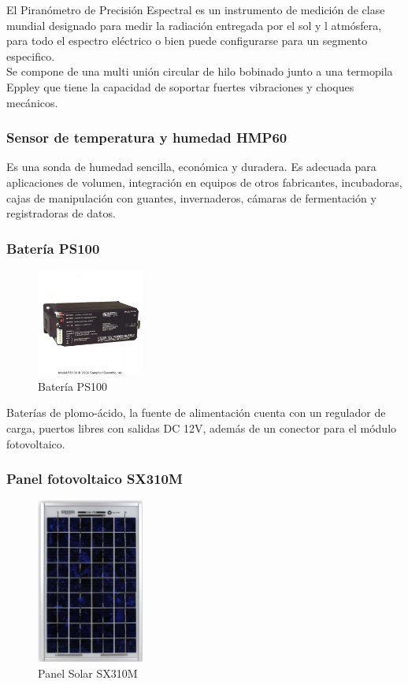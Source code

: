 El Piranómetro de Precisión Espectral es un instrumento de medición de clase mundial designado para medir la radiación entregada por el sol y l atmósfera, para todo el espectro eléctrico o bien puede configurarse para un segmento especifico.\\
Se compone de una multi unión circular de hilo bobinado junto a una termopila Eppley que tiene la capacidad de soportar fuertes vibraciones y choques mecánicos.

\subsubsection{Sensor de temperatura y humedad HMP60}
Es una sonda de humedad sencilla, económica y duradera. Es adecuada para aplicaciones de volumen, integración en equipos de otros fabricantes, incubadoras, cajas de manipulación con guantes, invernaderos, cámaras de fermentación y registradoras de datos.

\subsubsection{Batería PS100}

\begin{figure}[h!]
        \centering
        \includegraphics[width=100pt]{images/bateria}
        \caption{Batería PS100} 
\end{figure}

Baterías de plomo-ácido, la fuente de alimentación cuenta con un regulador de carga, puertos libres con salidas DC 12V, además de un conector para el módulo fotovoltaico.

\subsubsection{Panel fotovoltaico SX310M}

\begin{figure}[h!]
        \centering
        \includegraphics[width=100pt]{images/panelSolar}
        \caption{Panel Solar SX310M} 
\end{figure}

